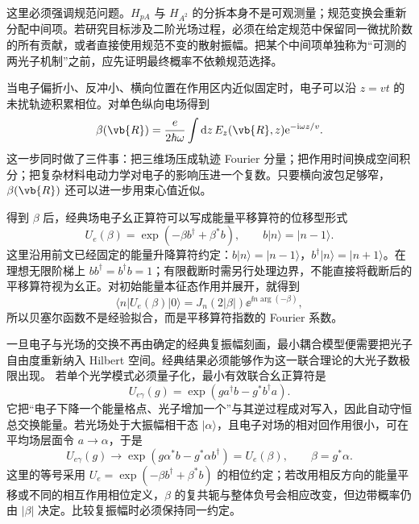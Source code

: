 这里必须强调规范问题。$H_{pA}$ 与 $H_{A^2}$ 的分拆本身不是可观测量；规范变换会重新分配中间项。若研究目标涉及二阶光场过程，必须在给定规范中保留同一微扰阶数的所有贡献，或者直接使用规范不变的散射振幅。把某个中间项单独称为“可测的两光子机制”之前，应先证明最终概率不依赖规范选择。

当电子偏折小、反冲小、横向位置在作用区内近似固定时，电子可以沿 $z=vt$ 的未扰轨迹积累相位。对单色纵向电场得到
\begin{equation}
\beta(\vb{R})=\frac{e}{2\hbar\omega}\int \dd z\,E_z(\vb{R},z)\ee^{-\ii\omega z/v}.
\label{eq:ch08-beta}
\end{equation}
这一步同时做了三件事：把三维场压成轨迹 Fourier 分量；把作用时间换成空间积分；把复杂材料电动力学对电子的影响压进一个复数。只要横向波包足够窄，$\beta(\vb{R})$ 还可以进一步用束心值近似。

得到 $\beta$ 后，经典场电子幺正算符可以写成能量平移算符的位移型形式
\begin{equation}
U_e(\beta)=\exp(-\beta b^\dagger+\beta^*b),
\qquad b|n\rangle=|n-1\rangle.
\label{eq:ch08-electron-displacement}
\end{equation}
这里沿用前文已经固定的能量升降算符约定：$b|n\rangle=|n-1\rangle$，$b^\dagger|n\rangle=|n+1\rangle$。在理想无限阶梯上 $bb^\dagger=b^\dagger b=1$；有限截断时需另行处理边界，不能直接将截断后的平移算符视为幺正。对初始能量本征态作用并展开，就得到
\begin{equation}
\langle n|U_e(\beta)|0\rangle
=J_n(2|\beta|)\ee^{\ii n\arg(-\beta)},
\label{eq:ch08-bessel}
\end{equation}
所以贝塞尔函数不是经验拟合，而是平移算符指数的 Fourier 系数。

一旦电子与光场的交换不再由确定的经典复振幅刻画，最小耦合模型便需要把光子自由度重新纳入 Hilbert 空间。经典结果必须能够作为这一联合理论的大光子数极限出现。
若单个光学模式必须量子化，最小有效联合幺正算符是
\begin{equation}
U_{e\gamma}(g)=\exp(g a^\dagger b-g^*b^\dagger a).
\label{eq:ch08-quantum-pinem}
\end{equation}
它把“电子下降一个能量格点、光子增加一个”与其逆过程成对写入，因此自动守恒总交换能量。若光场处于大振幅相干态 $|\alpha\rangle$，且电子对场的相对回作用很小，可在平均场层面令 $a\to\alpha$，于是
\begin{equation}
U_{e\gamma}(g)\longrightarrow
\exp(g\alpha^* b-g^*\alpha b^\dagger)
=U_e(\beta),
\qquad \beta=g^*\alpha.
\label{eq:ch08-classical-limit}
\end{equation}
这里的等号采用 $U_e=\exp(-\beta b^\dagger+\beta^*b)$ 的相位约定；若改用相反方向的能量平移或不同的相互作用相位定义，$\beta$ 的复共轭与整体负号会相应改变，但边带概率仍由 $|\beta|$ 决定。比较复振幅时必须保持同一约定。

